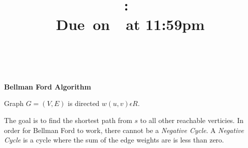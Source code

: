 \documentclass{article}
\title{
    \vspace{2in}
    \textmd{\textbf{\hmwkClass:\ \hmwkTitle}}\\
    \normalsize\vspace{0.1in}\small{Due\ on\ \hmwkDueDate\ at 11:59pm}\\
    \vspace{0.1in}\large{\textit{\hmwkClassInstructor\ \hmwkClassTime}}
    \vspace{3in}
}
\author{\hmwkAuthorName}
\date{}
\begin{document}
\maketitle
\pagebreak

\textbf{Bellman Ford Algorithm}

Graph $G = (V,E)$ is directed $w(u,v) \epsilon R$.

The goal is to find the shortest path from $s$ to all other reachable verticies. In order for Bellman Ford to work, there cannot be a \textit{Negative Cycle}. A \textit{Negative Cycle} is a cycle where the sum of the edge weights are is less than zero. 
\end{document}
